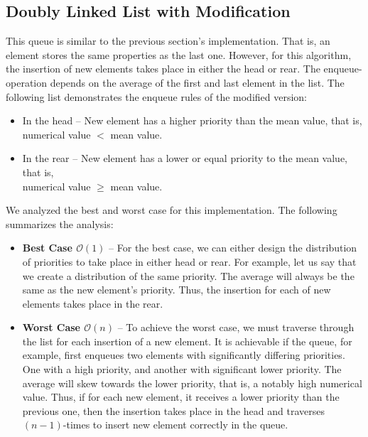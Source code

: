 \documentclass[a4paper,11pt]{kth-mag}
\newcommand*{\skippara}{\par\vspace{\baselineskip} \noindent}
\begin{document}
\subsection{Doubly Linked List with Modification}
This queue is similar to the previous section's implementation.
That is, an element stores the same properties as the last one.
However, for this algorithm, the insertion of new elements takes place in either the head or rear.
The enqueue-operation depends on the average of the first and last element in the list.
The following list demonstrates the enqueue rules of the modified version:
\begin{itemize}
    \item In the head -- New element has a higher priority than the mean value, that is, \\numerical value $<$ mean value.
    \item In the rear -- New element has a lower or equal priority to the mean value, that is,\\numerical value $\ge$ mean value.
\end{itemize}

\skippara We analyzed the best and worst case for this implementation.
The following summarizes the analysis:
\begin{itemize}
    \item \textbf{Best Case $\mathcal{O}(1)$} -- For the best case, we can either design the distribution of priorities to take place in either head or rear.
        For example, let us say that we create a distribution of the same priority.
        The average will always be the same as the new element's priority.
        Thus, the insertion for each of new elements takes place in the rear.
    \item \textbf{Worst Case $\mathcal{O}(n)$} -- To achieve the worst case, we must traverse through the list for each insertion of a new element.
        It is achievable if the queue, for example, first enqueues two elements with significantly differing priorities.
        One with a high priority, and another with significant lower priority.
        The average will skew towards the lower priority, that is, a notably high numerical value.
        Thus, if for each new element, it receives a lower priority than the previous one, then the insertion takes place in the head and traverses $(n-1)$-times to insert new element correctly in the queue.
\end{itemize}
\end{document}
